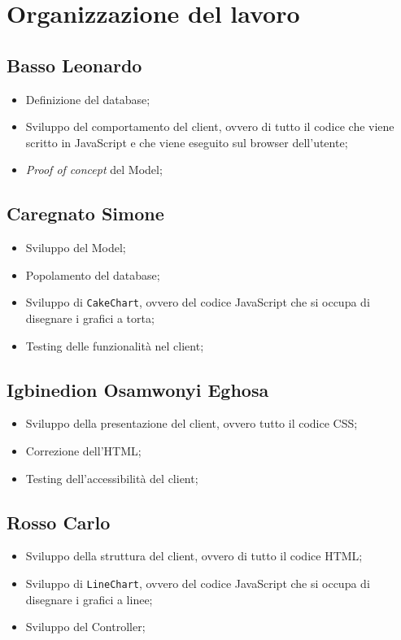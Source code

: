 \section{Organizzazione del lavoro}

\subsection{Basso Leonardo}
\begin{itemize}
	\item Definizione del database;

	\item Sviluppo del comportamento del client, ovvero di tutto il codice che
		viene scritto in JavaScript e che viene eseguito sul browser 
		dell'utente;

	\item \textit{Proof of concept} del Model;
\end{itemize}

\subsection{Caregnato Simone}
\begin{itemize}
	\item Sviluppo del Model;
	\item Popolamento del database;
	\item Sviluppo di \texttt{CakeChart}, ovvero del codice JavaScript che si 
		occupa di disegnare i grafici a torta;
	\item Testing delle funzionalità nel client;
\end{itemize}

\subsection{Igbinedion Osamwonyi Eghosa}
\begin{itemize}
	\item Sviluppo della presentazione del client, ovvero tutto il codice CSS;
	\item Correzione dell'HTML;
	\item Testing dell'accessibilità del client;
\end{itemize}

\subsection{Rosso Carlo}
\begin{itemize}
	\item Sviluppo della struttura del client, ovvero di tutto il codice HTML;
	\item Sviluppo di \texttt{LineChart}, ovvero del codice JavaScript che si 
		occupa di disegnare i grafici a linee;
	\item Sviluppo del Controller;
\end{itemize}
